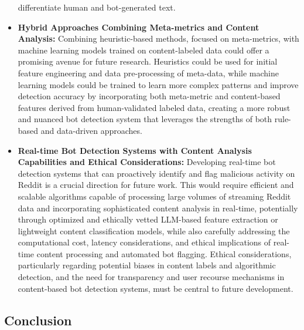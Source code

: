 \documentclass[
  12pt,
  letterpaper,
  DIV=11,
  numbers=noendperiod]{scrartcl}
\begin{document}
\begin{itemize}
  differentiate human and bot-generated text.
\item
  \textbf{Hybrid Approaches Combining Meta-metrics and Content
  Analysis:} Combining heuristic-based methods, focused on meta-metrics,
  with machine learning models trained on content-labeled data could
  offer a promising avenue for future research. Heuristics could be used
  for initial feature engineering and data pre-processing of meta-data,
  while machine learning models could be trained to learn more complex
  patterns and improve detection accuracy by incorporating both
  meta-metric and content-based features derived from human-validated
  labeled data, creating a more robust and nuanced bot detection system
  that leverages the strengths of both rule-based and data-driven
  approaches.
\item
  \textbf{Real-time Bot Detection Systems with Content Analysis
  Capabilities and Ethical Considerations:} Developing real-time bot
  detection systems that can proactively identify and flag malicious
  activity on Reddit is a crucial direction for future work. This would
  require efficient and scalable algorithms capable of processing large
  volumes of streaming Reddit data and incorporating sophisticated
  content analysis in real-time, potentially through optimized and
  ethically vetted LLM-based feature extraction or lightweight content
  classification models, while also carefully addressing the
  computational cost, latency considerations, and ethical implications
  of real-time content processing and automated bot flagging. Ethical
  considerations, particularly regarding potential biases in content
  labels and algorithmic detection, and the need for transparency and
  user recourse mechanisms in content-based bot detection systems, must
  be central to future development.
\end{itemize}

\subsection{Conclusion}\label{conclusion}
\end{document}
